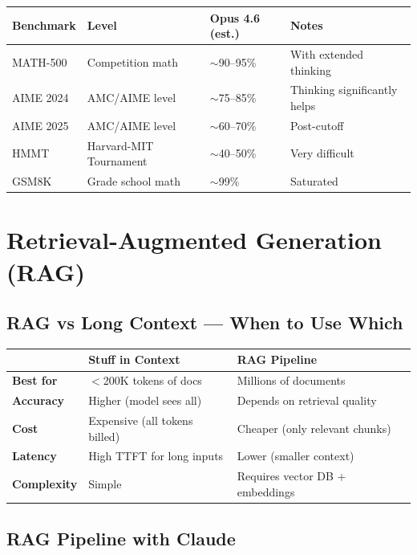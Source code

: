 \documentclass[11pt,a4paper]{article}
\begin{document}
\begin{center}
\begin{tabular}{llll}
\toprule
\textbf{Benchmark} & \textbf{Level} & \textbf{Opus 4.6 (est.)} & \textbf{Notes} \\
\midrule
MATH-500 & Competition math & $\sim$90--95\% & With extended thinking \\
AIME 2024 & AMC/AIME level & $\sim$75--85\% & Thinking significantly helps \\
AIME 2025 & AMC/AIME level & $\sim$60--70\% & Post-cutoff \\
HMMT & Harvard-MIT Tournament & $\sim$40--50\% & Very difficult \\
GSM8K & Grade school math & $\sim$99\% & Saturated \\
\bottomrule
\end{tabular}
\end{center}

\section{Retrieval-Augmented Generation (RAG)}

\subsection{RAG vs Long Context --- When to Use Which}

\begin{center}
\begin{tabular}{L{4cm}L{5cm}L{5cm}}
\toprule
& \textbf{Stuff in Context} & \textbf{RAG Pipeline} \\
\midrule
\textbf{Best for} & $<$200K tokens of docs & Millions of documents \\
\textbf{Accuracy} & Higher (model sees all) & Depends on retrieval quality \\
\textbf{Cost} & Expensive (all tokens billed) & Cheaper (only relevant chunks) \\
\textbf{Latency} & High TTFT for long inputs & Lower (smaller context) \\
\textbf{Complexity} & Simple & Requires vector DB + embeddings \\
\bottomrule
\end{tabular}
\end{center}

\subsection{RAG Pipeline with Claude}
\end{document}
